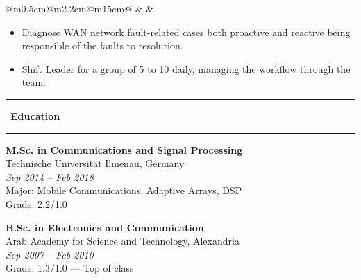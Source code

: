 \documentclass[10pt,a4paper]{article}
\newcommand{\sectionline}[1]{%
  \vspace{0.5em}
  \begin{center}
    \textcolor{title_color}{\rule[0.5ex]{0.25\linewidth}{0.5pt}}
    ~{\LARGE \bfseries \textcolor{title_color}{\cambria #1}}~
    \textcolor{title_color}{\rule[0.5ex]{0.25\linewidth}{0.5pt}}
  \end{center}
  \vspace{0.05em}
}
\begin{document}
\vspace{1.3em}
\begin{tabular}{@{}m{0.5cm}@{\hspace{0.5em}}m{2.2cm}@{\hspace{0.5em}}m{15cm}@{}}
   & 
  \raisebox{1em}{\begin{minipage}[t]{\linewidth}
  \centering
    \textcolor{blocktitle1_color}{Jul. 11}\\
    \textcolor{blocktitle1_color}{Aug. 14}
  \end{minipage} 
  } &
\end{tabular} 


\vspace{0.4em}
\begin{itemize}[leftmargin=*]
  \item Diagnose WAN network fault-related cases both proactive and reactive being responsible of the faults to resolution.
  \item Shift Leader for a group of 5 to 10 daily, managing the workflow through the team. 
\end{itemize}

\sectionline{Education}
\textbf{M.Sc. in Communications and Signal Processing}\\
Technische Universität Ilmenau, Germany\\
\textit{Sep 2014 -- Feb 2018}\\
Major: Mobile Communications, Adaptive Arrays, DSP\\
Grade: 2.2/1.0

\vspace{0.6em}
\textbf{B.Sc. in Electronics and Communication}\\
Arab Academy for Science and Technology, Alexandria\\
\textit{Sep 2007 -- Feb 2010}\\
Grade: 1.3/1.0 — Top of class
\end{document}
